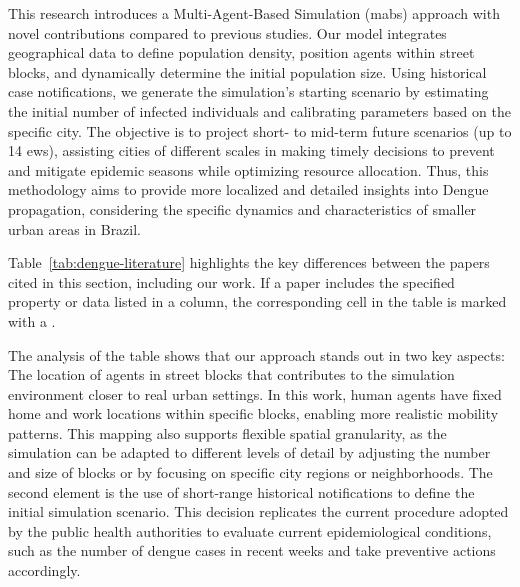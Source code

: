 This research introduces a Multi-Agent-Based Simulation (\gls{mabs}) approach
with novel contributions compared to previous studies. Our model integrates
geographical data to define population density, position agents within street
blocks, and dynamically determine the initial population size. Using historical
case notifications, we generate the simulation’s starting scenario by estimating
the initial number of infected individuals and calibrating parameters based on
the specific city. The objective is to project short- to mid-term future
scenarios (up to 14 \gls{ews}), assisting cities of different scales in making
timely decisions to prevent and mitigate epidemic seasons while optimizing
resource allocation. Thus, this methodology aims to provide more localized and
detailed insights into Dengue propagation, considering the specific dynamics and
characteristics of smaller urban areas in Brazil.

Table~\ref{tab:dengue-literature} highlights the key differences between the
papers cited in this section, including our work. If a paper includes the
specified property or data listed in a column, the corresponding cell in the
table is marked with a \checkmark.

The analysis of the table shows that our approach stands out in two key aspects:
The location of agents in street blocks that contributes to the simulation
environment closer to real urban settings. In this work, human agents have fixed
home and work locations within specific blocks, enabling more realistic mobility
patterns. This mapping also supports flexible spatial granularity, as the
simulation can be adapted to different levels of detail by adjusting the number
and size of blocks or by focusing on specific city regions or neighborhoods. The
second element is the use of short-range historical notifications to define the
initial simulation scenario. This decision replicates the current procedure
adopted by the public health authorities to evaluate current epidemiological
conditions, such as the number of dengue cases in recent weeks and take
preventive actions accordingly.

